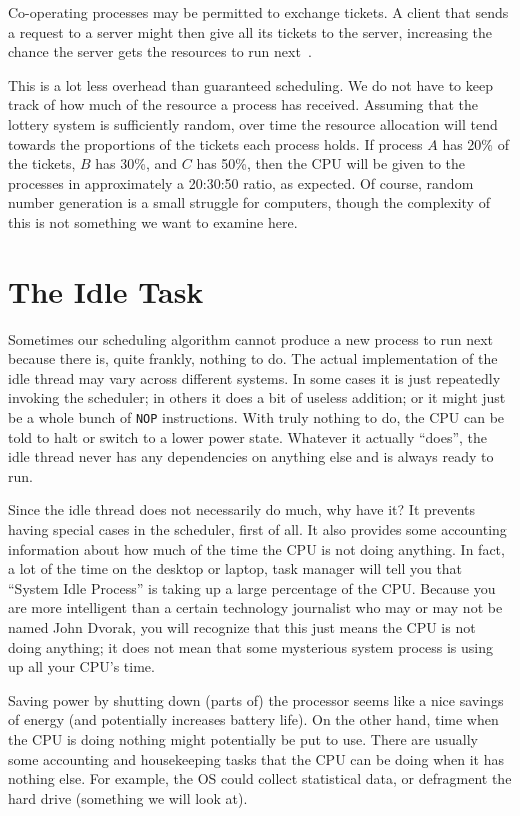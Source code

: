 Co-operating processes may be permitted to exchange tickets. A client that sends a request to a server might then give all its tickets to the server, increasing the chance the server gets the resources to run next~\cite{mos}.

This is a lot less overhead than guaranteed scheduling. We do not have to keep track of how much of the resource a process has received. Assuming that the lottery system is sufficiently random, over time the resource allocation will tend towards the proportions of the tickets each process holds. If process $A$ has 20\% of the tickets, $B$ has 30\%, and $C$ has 50\%, then the CPU will be given to the processes in approximately a 20:30:50 ratio, as expected. Of course, random number generation is a small struggle for computers, though the complexity of this is not something we want to examine here.


\section*{The Idle Task}

Sometimes our scheduling algorithm cannot produce a new process to run next because there is, quite frankly, nothing to do. The actual implementation of the idle thread may vary across different systems. In some cases it is just repeatedly invoking the scheduler; in others it does a bit of useless addition; or it might just be a whole bunch of \texttt{NOP} instructions. With truly nothing to do, the CPU can be told to halt or switch to a lower power state. Whatever it actually ``does'', the idle thread never has any dependencies on anything else and is always ready to run.

Since the idle thread does not necessarily do much, why have it? It prevents having special cases in the scheduler, first of all. It also provides some accounting information about how much of the time the CPU is not doing anything. In fact, a lot of the time on the desktop or laptop, task manager will tell you that ``System Idle Process'' is taking up a large percentage of the CPU. Because you are more intelligent than a certain technology journalist who may or may not be named John Dvorak, you will recognize that this just means the CPU is not doing anything; it does not mean that some mysterious system process is using up all your CPU's time.

Saving power by shutting down (parts of) the processor seems like a nice savings of energy (and potentially increases battery life). On the other hand, time when the CPU is doing nothing might potentially be put to use. There are usually some accounting and housekeeping tasks that the CPU can be doing when it has nothing else. For example, the OS could collect statistical data, or defragment the hard drive (something we will look at).

